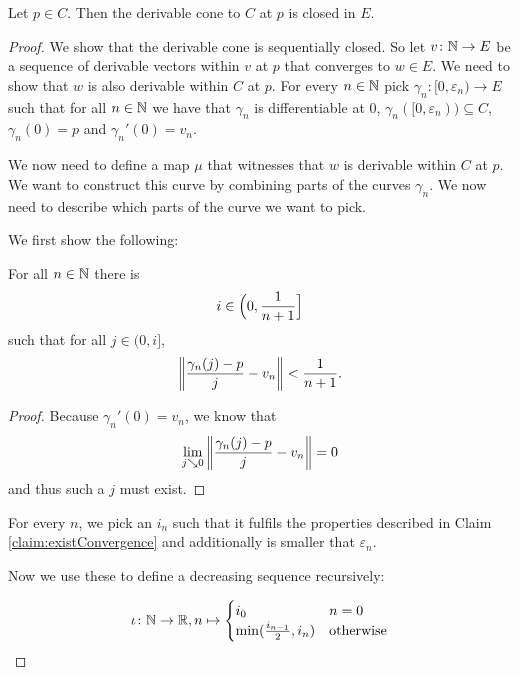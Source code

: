 \begin{lem}
Let $p \in C$. 
Then the derivable cone to $C$ at $p$ is closed in $E$. 
\end{lem}
\begin{proof}
We show that the derivable cone is sequentially closed. 
So let $v \colon \mathbb{N} \to E$ be a sequence of derivable vectors within $v$ at $p$ that converges to $w \in E$. 
We need to show that $w$ is also derivable within $C$ at $p$.
For every $n \in \mathbb{N}$ pick $\gamma_n \colon [0, \varepsilon_n) \to E$ such that for all $n \in \mathbb{N}$ we have that $\gamma_n$ is differentiable at $0$, $\gamma_n ([0, \varepsilon_n)) \subseteq C$, $\gamma_n(0) = p$ and $\gamma_n'(0) = v_n$.    

We now need to define a map $\mu$ that witnesses that $w$ is derivable within $C$ at $p$. 
We want to construct this curve by combining parts of the curves $\gamma_n$.
We now need to describe which parts of the curve we want to pick.  

We first show the following: 

\begin{claim}\label{claim:existConvergence}
For all $n \in \mathbb{N}$ there is
\begin{equation*}
i \in \Bigl(0, \frac{1}{n + 1}\Bigr]
\end{equation*}
such that for all $j \in (0, i]$, 
\begin{equation*}
\left\lVert\frac{\gamma_n(j) - p}{j} - v_n\right\rVert < \frac{1}{n + 1}.
\end{equation*}
\begin{proof}
Because $\gamma_n'(0) = v_n$, we know that 
\begin{equation*}
\lim_{j \searrow 0}\left\lVert\frac{\gamma_n(j) - p}{j} - v_n\right\rVert = 0
\end{equation*}
and thus such a $j$ must exist.
\end{proof}
\end{claim}


For every $n$, we pick an $i_n$ such that it fulfils the properties described in Claim \ref{claim:existConvergence} and additionally is smaller that $\varepsilon_n$.

Now we use these to define a decreasing sequence recursively:

\begin{equation*}
\iota \colon \mathbb{N} \to \mathbb{R}, n \mapsto \begin{cases}
    i_0 & n = 0 \\ 
    \min (\frac{i_{n-1}}{2}, i_n) & \text{otherwise} \\ 
\end{cases}
\end{equation*}


\end{proof}
